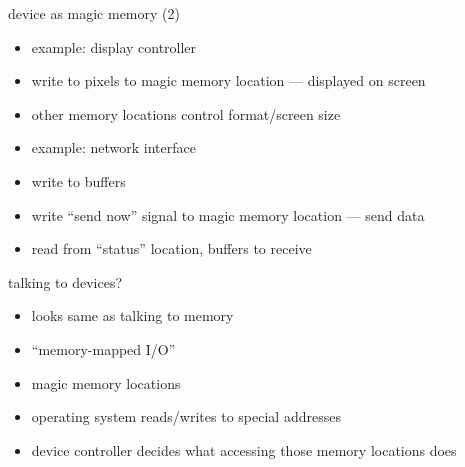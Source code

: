 \begin{frame}{device as magic memory (2)}
    \begin{itemize}
    \item example: display controller
    \item write to pixels to magic memory location --- displayed on screen
    \item other memory locations control format/screen size
        \vspace{.5cm}
    \item example: network interface
    \item write to buffers 
    \item write ``send now'' signal to magic memory location --- send data
    \item read from ``status'' location, buffers to receive
    \end{itemize}
\end{frame}
\begin{frame}{talking to devices?}
    \begin{itemize}
    \item looks same as talking to memory
    \vspace{.5cm}
    \item ``memory-mapped I/O''
    \item magic memory locations
    \vspace{.5cm}
    \item operating system reads/writes to special addresses
    \item device controller decides what accessing those memory locations does
    \end{itemize}
\end{frame}

